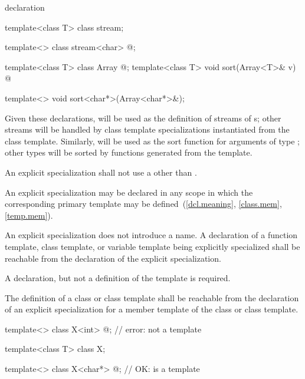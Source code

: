 \begin{bnf}
\br
   \terminal{<} \terminal{>} declaration
\end{bnf}

\begin{example}
\begin{codeblock}
template<class T> class stream;

template<> class stream<char> { @\commentellip@ };

template<class T> class Array { @\commentellip@ };
template<class T> void sort(Array<T>& v) { @\commentellip@ }

template<> void sort<char*>(Array<char*>&);
\end{codeblock}

Given these declarations,
will be used as the definition of streams of
s;
other streams will be handled by class template specializations instantiated
from the class template.
Similarly,
will be used as the sort function for arguments
of type
;
other
types will be sorted by functions generated from the template.
\end{example}

\pnum
An explicit specialization shall not use
a 
other than .

\pnum
An explicit specialization
may be declared in any scope in which the corresponding primary template
may be defined~(\ref{dcl.meaning}, \ref{class.mem}, \ref{temp.mem}).

\pnum
An explicit specialization does not introduce a name.
A declaration of a function template, class template, or variable template being explicitly
specialized shall be reachable from the declaration of
the explicit
specialization.
\begin{note}
A declaration, but not a definition of the template is required.
\end{note}
The definition of a class or class template shall be reachable from the
declaration of an explicit specialization for a member template of the class
or class template.
\begin{example}
\begin{codeblock}
template<> class X<int> { @\commentellip@ };          // error:  not a template

template<class T> class X;

template<> class X<char*> { @\commentellip@ };        // OK:  is a template
\end{codeblock}
\end{example}

